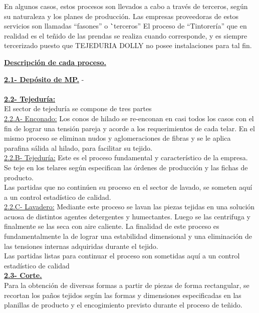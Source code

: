 \documentclass[a4paper,12pt,titlepage]{article}
\begin{document}
En algunos casos, estos procesos son llevados a cabo a trav\'{e}s de terceros, seg\'{u}n
su naturaleza y los planes de producci\'{o}n. Las empresas proveedoras de estos
servicios son llamadas ``fasones'' o \``terceros''
El proceso de ``Tintorer\'{i}a'' que en realidad es el te\~nido de las prendas se realiza
cuando corresponde, y es siempre tercerizado puesto que TEJEDURIA DOLLY no
posee instalaciones para tal fin.\\

\begin{center}\textbf{\underline{Descripci\'{o}n de cada proceso.}}\end{center}
\textbf{\underline{2.1- Dep\'{o}sito de MP.}} 
 -\\ \\
\textbf{\underline{2.2- Tejedur\'{i}a:}}\\
El sector de tejedur\'{i}a se compone de tres partes\\
\underline{2.2.A- Enconado:} Los conos de hilado se re-enconan en casi todos los casos con
el fin de lograr una tensi\'{o}n pareja y acorde a los requerimientos de cada telar. En
el mismo proceso se eliminan nudos y aglomeraciones de fibras y se le aplica
parafina s\'{a}lida al hilado, para facilitar su tejido.\\
\underline{2.2.B- Tejedur\'{i}a:} Este es el proceso fundamental y caracter\'{i}stico de la empresa.
Se teje en los telares seg\'{u}n especifican las \'{o}rdenes de producci\'{o}n y las fichas de
producto.\\
Las partidas que no contin\'{u}en su proceso en el sector de lavado, se someten aqu\'{i}
a un control estad\'{i}stico de calidad.\\
\underline{2.2.C- Lavadero:} Mediante este proceso se lavan las piezas tejidas en una soluci\'{o}n
acuosa de distintos agentes detergentes y humectantes. Luego se las centrifuga y
finalmente se las seca con aire caliente. La finalidad de este proceso es
fundamentalmente la de lograr una estabilidad dimensional y una eliminaci\'{o}n de
las tensiones internas adquiridas durante el tejido.\\
Las partidas listas para continuar el proceso son sometidas aqu\'{i} a un control
estad\'{i}stico de calidad\\
\textbf{\underline{2.3- Corte.}}\\
Para la obtenci\'{o}n de diversas formas a partir de piezas de forma rectangular, se
recortan los pa\~nos tejidos seg\'{u}n las formas y dimensiones especificadas en las
planillas de producto y el encogimiento previsto durante el proceso de te\~nido.
\end{document}

